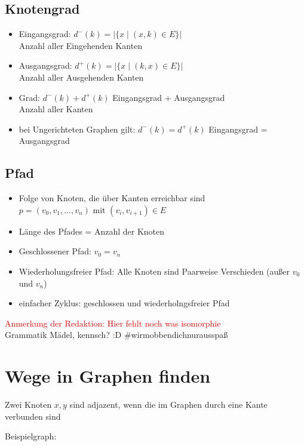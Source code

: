 \documentclass[a4paper,portrait]{scrartcl}
\begin{document}
\subsection{Knotengrad}
\begin{itemize}
\item Eingangsgrad: $d^{-}(k) = |\lbrace x \mid (x,k) \in E \rbrace|$\\
Anzahl aller Eingehenden Kanten
\item Ausgangsgrad: $d^{+}(k) = |\lbrace x \mid (k,x) \in E \rbrace|$\\
Anzahl aller Ausgehenden Kanten
\item Grad: $d^{-}(k) + d^{+}(k)$  Eingangsgrad + Ausgangsgrad\\
Anzahl aller Kanten
\item bei Ungerichteten Graphen gilt: $d^{-}(k) = d^{+}(k)$ Eingangsgrad = Ausgangsgrad
\end{itemize}
\subsection{Pfad}
\begin{itemize}
\item Folge von Knoten, die über Kanten erreichbar sind \\
$ p=(v_{0}, v_{1}, ..., v_{n}) $ mit $ (v_{i}, v_{i+1}) \in E $
\item Länge des Pfades = Anzahl der Knoten
\item Geschlossener Pfad: $ v_{0} = v_{n} $
\item Wiederholungsfreier Pfad: Alle Knoten sind Paarweise Verschieden (außer $ v_{0} $ und $ v_{n} $)
\item einfacher Zyklus: geschlossen und wiederholngsfreier Pfad
\end{itemize}
\textcolor{red}{Anmerkung der Redaktion: \grqq Hier fehlt noch was isomorphie\grqq}\\ Grammatik Mädel, kennsch? :D \#wirmobbendichnurausspaß
\section{Wege in Graphen finden}
Zwei Knoten $x,y$ sind adjazent, wenn die im Graphen durch eine Kante verbunden sind

Beispielgraph:
\end{document}
